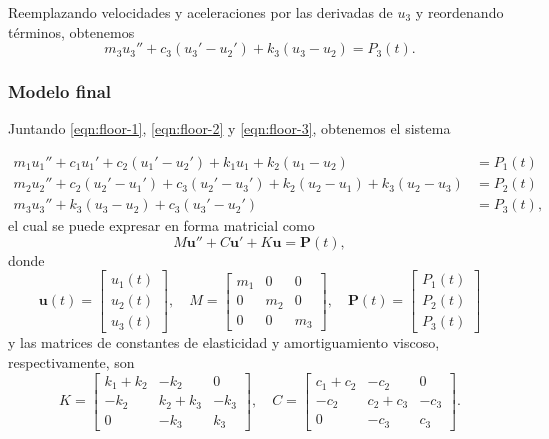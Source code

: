 Reemplazando velocidades y aceleraciones por las derivadas de \(u_3\) y reordenando términos, obtenemos
\begin{equation}\label{eqn:floor-3}
    m_3 u_3'' + c_3(u_3' - u_2') + k_3(u_3 - u_2) = P_3(t)
.\end{equation}


\subsubsection*{Modelo final}

Juntando \eqref{eqn:floor-1}, \eqref{eqn:floor-2} y \eqref{eqn:floor-3}, obtenemos el sistema

\begin{align*}
    m_1 u_1'' + c_1 u_1' + c_2(u_1' - u_2') + k_1 u_1 + k_2(u_1 - u_2) &= P_1(t) \\
    m_2 u_2'' + c_2(u_2' - u_1') + c_3(u_2' - u_3') + k_2(u_2 - u_1) + k_3(u_2 - u_3) &= P_2(t) \\
    m_3 u_3'' + k_3(u_3 - u_2) + c_3(u_3' - u_2') &= P_3(t)
,\end{align*}
el cual se puede expresar en forma matricial como
\begin{equation}\label{eqn:matrix-form}
    M\mathbf{u}'' + C\mathbf{u}' + K\mathbf{u} = \mathbf{P}(t)
,\end{equation}
donde
\begin{equation}
    \mathbf{u}(t) = \begin{bmatrix} u_1(t) \\ u_2(t) \\ u_3(t) \end{bmatrix},
    \quad
    M = \begin{bmatrix}
        m_1 & 0 & 0 \\
        0 & m_2 & 0 \\
        0 & 0 & m_3
    \end{bmatrix},
    \quad
    \mathbf{P}(t) = \begin{bmatrix} P_1(t) \\ P_2(t) \\ P_3(t) \end{bmatrix}
\end{equation}
y las matrices de constantes de elasticidad y amortiguamiento viscoso, respectivamente, son
\begin{equation}
    K = \begin{bmatrix}
        k_1 + k_2 & -k_2 & 0 \\
        -k_2 & k_2 + k_3 & -k_3 \\
        0 & -k_3 & k_3
    \end{bmatrix},
    \quad
    C = \begin{bmatrix}
        c_1 + c_2 & -c_2 & 0 \\
        -c_2 & c_2 + c_3 & -c_3 \\
        0 & -c_3 & c_3
    \end{bmatrix}
.\end{equation}

